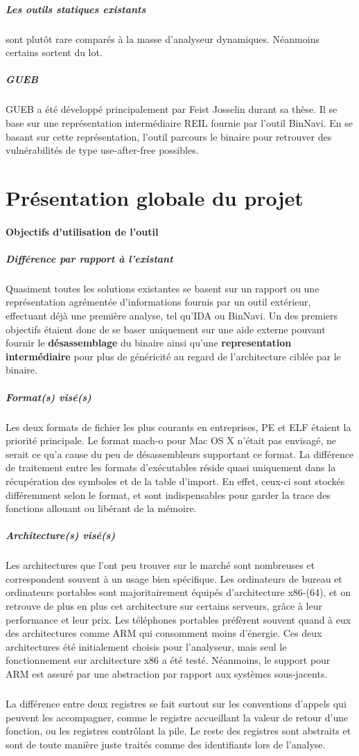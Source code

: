 \subparagraph{Les outils statiques existants} sont plutôt rare comparés à la masse d'analyseur dynamiques. Néanmoins certains sortent du lot.

\subparagraph{GUEB}
GUEB a été développé principalement par Feist Josselin durant sa thèse. Il se base sur une représentation intermédiaire
REIL fournie par l'outil BinNavi. En se basant sur cette représentation, l'outil parcours le binaire pour retrouver des vulnérabilités
de type use-after-free possibles.

\section{Présentation globale du projet}

\paragraph{Objectifs d'utilisation de l'outil}

\subparagraph{Différence par rapport à l'existant}

Quasiment toutes les solutions existantes se basent sur un rapport ou une représentation agrémentée d'informations fournis
par un outil extérieur, effectuant déjà une première analyse, tel qu'IDA ou BinNavi. Un des premiers objectifs étaient donc de
se baser uniquement sur une aide externe pouvant fournir le \textbf{désassemblage} du binaire ainsi qu'une \textbf{representation intermédiaire}
pour plus de généricité au regard de l'architecture ciblée par le binaire.

\subparagraph{Format(s) visé(s)}

Les deux formats de fichier les plus courants en entreprises, PE et ELF étaient la priorité principale. Le format mach-o pour
Mac OS X n'était pas envisagé, ne serait ce qu'a cause du peu de désassembleurs supportant ce format. La différence de traitement
entre les formats d'exécutables réside quasi uniquement dans la récupération des symboles et de la table d'import. En effet, ceux-ci
sont stockés différemment selon le format, et sont indispensables pour garder la trace des fonctions allouant ou libérant de la mémoire.

\subparagraph{Architecture(s) visé(s)}
Les architectures que l'ont peu trouver sur le marché sont nombreuses et correspondent souvent à un usage bien spécifique.
Les ordinateurs de bureau et ordinateurs portables sont majoritairement équipés d'architecture x86-(64), et on retrouve de plus en plus
cet architecture sur certains serveurs, grâce à leur performance et leur prix. Les téléphones portables préfèrent souvent quand à eux
des architectures comme ARM qui consomment moins d'énergie. Ces deux architectures été initialement choisis pour l'analyseur, mais seul
le fonctionnement sur architecture x86 a été testé. Néanmoins, le support pour ARM est assuré par une abstraction par rapport aux systèmes
sous-jacents.
\subparagraph{}
La différence entre deux registres se fait surtout sur les conventions d'appels qui peuvent les accompagner, comme le registre accueillant
la valeur de retour d'une fonction, ou les registres contrôlant la pile. Le reste des registres sont abstraits et sont de toute manière
juste traités comme des identifiants lors de l'analyse.


